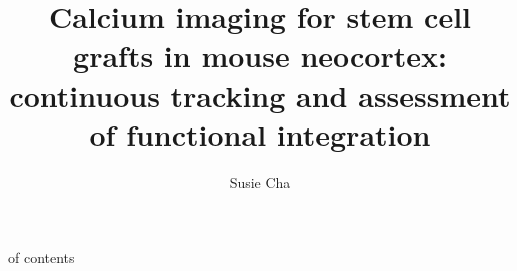 \title{Calcium imaging for stem cell grafts in mouse neocortex: continuous tracking and assessment of functional integration}
\author{Susie Cha}


\maketitle
\table of contents